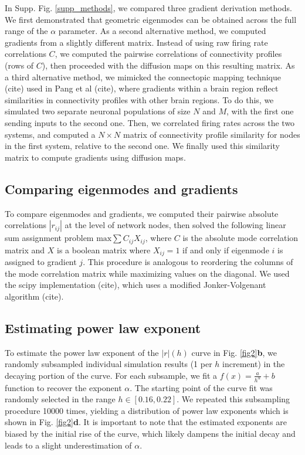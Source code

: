 \documentclass{article}
\begin{document}
In Supp. Fig. \ref{supp_methods}, we compared three gradient derivation methods. We first demonstrated that geometric eigenmodes can be obtained across the full range of the $\alpha$ parameter. As a second alternative method, we computed gradients from a slightly different matrix. Instead of using raw firing rate correlations $C$, we computed the pairwise correlations of connectivity profiles (rows of $C$), then proceeded with the diffusion maps on this resulting matrix. As a third alternative method, we mimicked the connectopic mapping technique (cite) used in Pang et al (cite), where gradients within a brain region reflect similarities in connectivity profiles with other brain regions. To do this, we simulated two separate neuronal populations of size $N$ and $M$, with the first one sending inputs to the second one. Then, we correlated firing rates across the two systems, and computed a $N\times N$ matrix of connectivity profile similarity for nodes in the first system, relative to the second one. We finally used this similarity matrix to compute gradients using diffusion maps. 

\subsection*{Comparing eigenmodes and gradients}

To compare eigenmodes and gradients, we computed their pairwise absolute correlations $|r_{ij}|$ at the level of network nodes, then solved the following linear sum assignment problem $\text{max}\sum C_{ij}X_{ij}$, where $C$ is the absolute mode correlation matrix and $X$ is a boolean matrix where $X_{ij}=1$ if and only if eigenmode $i$ is assigned to gradient $j$. This procedure is analogous to reordering the columns of the mode correlation matrix while maximizing values on the diagonal. We used the scipy implementation (cite), which uses a modified Jonker-Volgenant algorithm (cite). 

\subsection*{Estimating power law exponent}

To estimate the power law exponent of the $|r|(h)$ curve in Fig. \ref{fig2}\textbf{b}, we randomly subsampled individual simulation results (1 per $h$ increment) in the decaying portion of the curve. For each subsample, we fit a $f(x)=\frac{a}{h^\alpha}+b$ function to recover the exponent $\alpha$. The starting point of the curve fit was randomly selected in the range $h\in[0.16, 0.22]$. We repeated this subsampling procedure 10000 times, yielding a distribution of power law exponents which is shown in Fig. \ref{fig2}\textbf{d}. It is important to note that the estimated exponents are biased by the initial rise of the curve, which likely dampens the initial decay and leads to a slight underestimation of $\alpha$.
\end{document}
